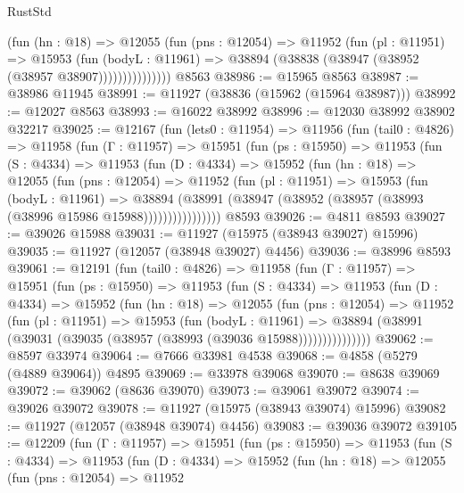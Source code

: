 \begin{lexlean}{RustStd}
\begin{coremodule}
                  (fun (hn : @18) =>
                  @12055
                    (fun (pns : @12054) =>
                    @11952
                      (fun (pl : @11951) =>
                      @15953
                        (fun (bodyL : @11961) =>
                        @38894 (@38838 (@38947 (@38952 (@38957 @38907)))))))))))))))
    @8563
@38986 := @15965 @8563
@38987 := @38986 @11945
@38991 := @11927 (@38836 (@15962 (@15964 @38987)))
@38992 := @12027 @8563
@38993 := @16022 @38992
@38996 := @12030 @38992 @38902 @32217
@39025 := @12167
    (fun (lets0 : @11954) =>
    @11956
      (fun (tail0 : @4826) =>
      @11958
        (fun (Γ : @11957) =>
        @15951
          (fun (ps : @15950) =>
          @11953
            (fun (S : @4334) =>
            @11953
              (fun (D : @4334) =>
              @15952
                (fun (hn : @18) =>
                @12055
                  (fun (pns : @12054) =>
                  @11952
                    (fun (pl : @11951) =>
                    @15953
                      (fun (bodyL : @11961) =>
                      @38894
                        (@38991
                          (@38947 (@38952 (@38957 (@38993 (@38996 @15986 @15988))))))))))))))))
    @8593
@39026 := @4811 @8593
@39027 := @39026 @15988
@39031 := @11927 (@15975 (@38943 @39027) @15996)
@39035 := @11927 (@12057 (@38948 @39027) @4456)
@39036 := @38996 @8593
@39061 := @12191
    (fun (tail0 : @4826) =>
    @11958
      (fun (Γ : @11957) =>
      @15951
        (fun (ps : @15950) =>
        @11953
          (fun (S : @4334) =>
          @11953
            (fun (D : @4334) =>
            @15952
              (fun (hn : @18) =>
              @12055
                (fun (pns : @12054) =>
                @11952
                  (fun (pl : @11951) =>
                  @15953
                    (fun (bodyL : @11961) =>
                    @38894 (@38991 (@39031 (@39035 (@38957 (@38993 (@39036 @15988)))))))))))))))
@39062 := @8597 @33974
@39064 := @7666 @33981 @4538
@39068 := @4858 (@5279 (@4889 @39064)) @4895
@39069 := @33978 @39068
@39070 := @8638 @39069
@39072 := @39062 (@8636 @39070)
@39073 := @39061 @39072
@39074 := @39026 @39072
@39078 := @11927 (@15975 (@38943 @39074) @15996)
@39082 := @11927 (@12057 (@38948 @39074) @4456)
@39083 := @39036 @39072
@39105 := @12209
    (fun (Γ : @11957) =>
    @15951
      (fun (ps : @15950) =>
      @11953
        (fun (S : @4334) =>
        @11953
          (fun (D : @4334) =>
          @15952
            (fun (hn : @18) =>
            @12055
              (fun (pns : @12054) =>
              @11952

\end{coremodule}
\end{lexlean}

